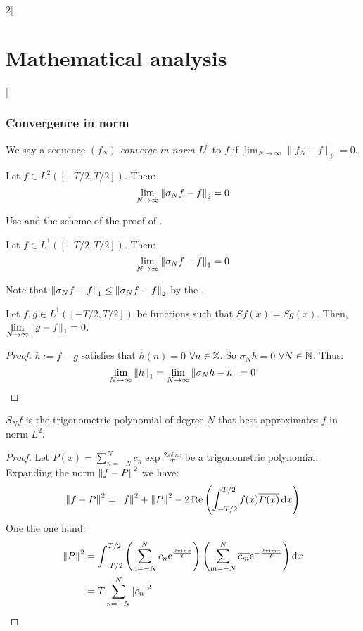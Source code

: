 \documentclass[../../../main_math.tex]{subfiles}
\begin{document}
\begin{multicols}{2}[\section{Mathematical analysis}]
  \subsubsection{Convergence in norm}
  \begin{definition}
    We say a sequence $(f_N)$ \emph{converge in norm $L^p$} to $f$ if $\displaystyle\lim_{N\to\infty}\|f_N-f\|_p=0$.
  \end{definition}
  \begin{theorem}
    Let $f\in L^2([-T/2,T/2])$. Then: $$\lim_{N\to\infty}\left\|\sigma_Nf-f\right\|_2=0$$
  \end{theorem}
  \begin{sproof}
    Use  and the scheme of the proof of .
  \end{sproof}
  \begin{corollary}
    Let $f\in L^1([-T/2,T/2])$. Then: $$\lim_{N\to\infty}\left\|\sigma_Nf-f\right\|_1=0$$
  \end{corollary}
  \begin{sproof}
    Note that $\left\|\sigma_Nf-f\right\|_1\leq\left\|\sigma_Nf-f\right\|_2$ by the .
  \end{sproof}
  \begin{corollary}
    Let $f,g\in L^1([-T/2,T/2])$ be functions such that $Sf(x)=Sg(x)$. Then, $\displaystyle\lim_{N\to\infty}\left\|g-f\right\|_1=0$.
  \end{corollary}
  \begin{proof}
    $h:=f-g$ satisfies that $\widehat{h}(n)=0$ $\forall n\in\mathbb{Z}$. So $\sigma_Nh=0$ $\forall N\in\mathbb{N}$. Thus:
    $$\lim_{N\to\infty}\left\|h\right\|_1=\lim_{N\to\infty}\left\|\sigma_Nh-h\right\|=0$$
  \end{proof}
  \begin{theorem}
    $S_Nf$ is the trigonometric polynomial of degree $N$ that best approximates $f$ in norm $L^2$.
  \end{theorem}
  \begin{proof}
    Let $P(x)=\sum_{n=-N}^{N}c_n\exp{\frac{2\pi\ii nx}{T}}$ be a trigonometric polynomial. Expanding the norm $\left\|f-P\right\|^2$ we have:
    $$\left\|f-P\right\|^2=\left\|f\right\|^2+\left\|P\right\|^2-2\Re\left(\int_{-T/2}^{T/2}f(x)\overline{P(x)}\dd{x}\right)$$
    One the one hand:
    \begin{align*}
      \norm{P}^2 & =\int_{-T/2}^{T/2}\left(\sum_{n=-N}^{N}c_n\exp{\frac{2\pi\ii nx}{T}}\right)\left(\sum_{m=-N}^{N}\overline{c_m}\exp{-\frac{2\pi\ii mx}{T}}\right)\dd{x} \\
                 & =T\sum_{n=-N}^{N}\abs{c_n}^2

\end{align*}
\end{proof}
\end{multicols}
\end{document}
